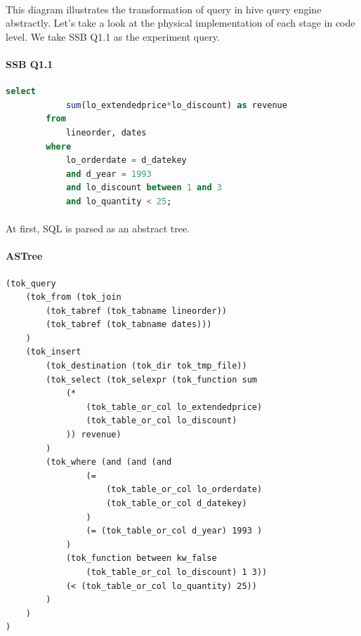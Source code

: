         \paragraph{}
        This diagram illustrates the transformation of query in hive query engine abstractly. Let's take a look at the 
        physical implementation of each stage in code level. We take SSB\cite{ssb} Q1.1 as the experiment query.
        \paragraph*{SSB Q1.1}
        \begin{lstlisting}[language={SQL},%frame=shadowbox,    
            keywordstyle=\color{blue!30!black},  
            basicstyle=\ttfamily]  
        select 
            sum(lo_extendedprice*lo_discount) as revenue
        from 
            lineorder, dates
        where 
            lo_orderdate = d_datekey
            and d_year = 1993
            and lo_discount between 1 and 3
            and lo_quantity < 25;
        \end{lstlisting} 
        \paragraph{}
        At first, SQL is parsed as an abstract tree.
        \paragraph*{ASTree}
        \begin{lstlisting}[language={},%frame=shadowbox,    
            keywordstyle=\color{blue!30!black},  
            basicstyle=\ttfamily]  
(tok_query 
    (tok_from (tok_join 
        (tok_tabref (tok_tabname lineorder)) 
        (tok_tabref (tok_tabname dates)))
    ) 
    (tok_insert 
        (tok_destination (tok_dir tok_tmp_file)) 
        (tok_select (tok_selexpr (tok_function sum 
            (* 
                (tok_table_or_col lo_extendedprice) 
                (tok_table_or_col lo_discount)
            )) revenue)
        ) 
        (tok_where (and (and (and 
                (= 
                    (tok_table_or_col lo_orderdate) 
                    (tok_table_or_col d_datekey)
                ) 
                (= (tok_table_or_col d_year) 1993 )
            ) 
            (tok_function between kw_false 
                (tok_table_or_col lo_discount) 1 3)) 
            (< (tok_table_or_col lo_quantity) 25))
        )
    )
)
        \end{lstlisting}
